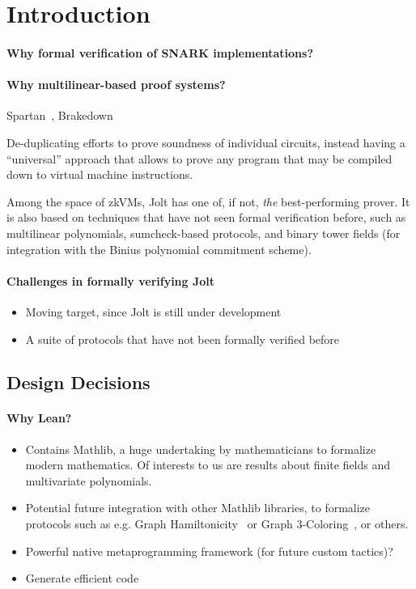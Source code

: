 \section{Introduction}\label{sec:intro}

\paragraph{Why formal verification of SNARK implementations?}

\paragraph{Why multilinear-based proof systems?}

Spartan~\cite{C:Setty20}, Brakedown

De-duplicating efforts to prove soundness of individual circuits, instead having a ``universal'' approach that allows to prove any program that may be compiled down to virtual machine instructions.

Among the space of zkVMs, Jolt has one of, if not, \emph{the} best-performing prover. It is also based on techniques that have not seen formal verification before, such as multilinear polynomials, sumcheck-based protocols, and binary tower fields (for integration with the Binius polynomial commitment scheme).

\paragraph{Challenges in formally verifying Jolt}

\begin{itemize}
    \item Moving target, since Jolt is still under development
    \item A suite of protocols that have not been formally verified before
\end{itemize}

\subsection{Design Decisions}


\paragraph{Why Lean?}

\begin{itemize}
    \item Contains Mathlib, a huge undertaking by mathematicians to formalize modern mathematics. Of interests to us are results about finite fields and multivariate polynomials.
    \item Potential future integration with other Mathlib libraries, to formalize protocols such as e.g. Graph Hamiltonicity~\cite{blum...} or Graph 3-Coloring~\cite{...}, or others.
    \item Powerful native metaprogramming framework (for future custom tactics)?
    \item Generate efficient code
\end{itemize}


